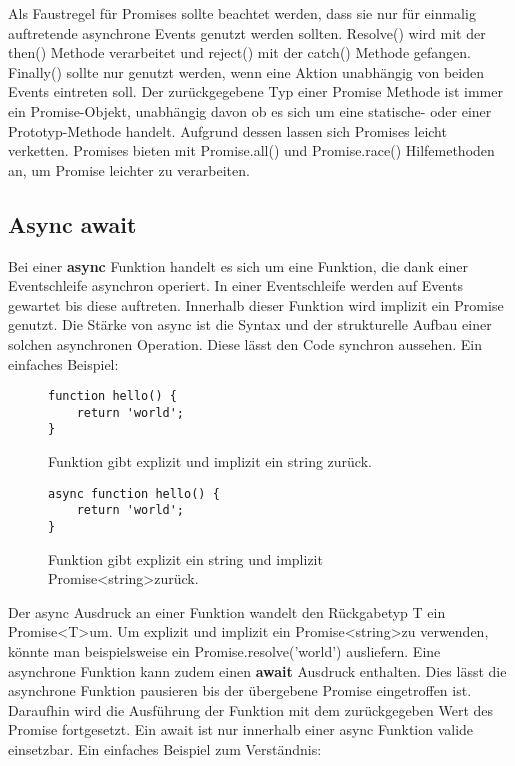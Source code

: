  \noindent
 Als Faustregel für Promises sollte beachtet werden, dass sie nur für einmalig auftretende asynchrone Events genutzt werden sollten. Resolve() wird mit der then() Methode verarbeitet und reject() mit der catch() Methode gefangen. Finally() sollte nur genutzt werden, wenn eine Aktion unabhängig von beiden Events eintreten soll. Der zurückgegebene Typ einer Promise Methode ist immer ein Promise-Objekt, unabhängig davon ob es sich um eine statische- oder einer Prototyp-Methode handelt. Aufgrund dessen lassen sich Promises leicht verketten. Promises bieten mit Promise.all() und Promise.race() Hilfemethoden an, um Promise leichter zu verarbeiten.

\subsection{Async await}
Bei einer \textbf{async} Funktion handelt es sich um eine Funktion, die dank einer Eventschleife asynchron operiert. In einer Eventschleife werden auf Events gewartet bis diese auftreten. Innerhalb dieser Funktion wird implizit ein Promise genutzt. Die Stärke von async ist die Syntax und der strukturelle Aufbau einer solchen asynchronen Operation. Diese lässt den Code synchron aussehen.\cite{async-await} Ein einfaches Beispiel:

\begin{figure}[H]
\begin{lstlisting}
function hello() {
    return 'world';
}
\end{lstlisting}
\caption{Funktion gibt explizit und implizit ein string zurück.}
\end{figure}

\begin{figure}[H]
\begin{lstlisting}
async function hello() {
    return 'world';
}
\end{lstlisting}
\caption{Funktion gibt explizit ein string und implizit Promise\textless string\textgreater zurück.}
\end{figure}

\noindent
Der async Ausdruck an einer Funktion wandelt den Rückgabetyp T ein Promise\textless T\textgreater um. Um explizit und implizit ein Promise\textless string\textgreater zu verwenden, könnte man beispielsweise ein Promise.resolve('world') ausliefern. Eine asynchrone Funktion kann zudem einen \textbf{await} Ausdruck enthalten. Dies lässt die asynchrone Funktion pausieren bis der übergebene Promise eingetroffen ist. Daraufhin wird die Ausführung der Funktion mit dem zurückgegeben Wert des Promise fortgesetzt. Ein await ist nur innerhalb einer async Funktion valide einsetzbar. Ein einfaches Beispiel zum Verständnis:\\

